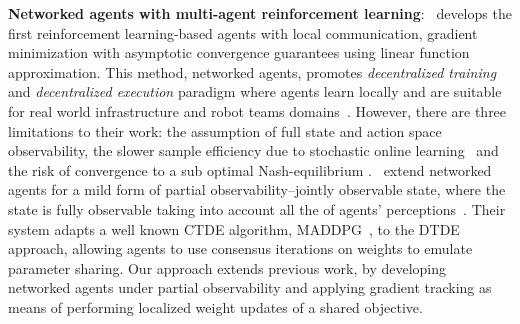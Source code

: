 \textbf{Networked agents with multi-agent reinforcement learning}:~\citet{zhang_2018}  develops the first reinforcement learning-based agents with local communication, gradient minimization with asymptotic convergence guarantees using linear function approximation. This method, networked agents, promotes {\em decentralized training} and {\em decentralized execution} paradigm where agents learn locally and are suitable for real world infrastructure and robot teams domains~\citep{gronauer_2022}. However, there are three limitations to their work: the assumption of full state and action space observability, the slower sample efficiency due to stochastic online learning~\citep{mnih_2016} and the risk of convergence to a sub optimal Nash-equilibrium \citep{zhang_2021}.~\citet{chen_2022} extend networked agents for a mild form of partial observability--jointly observable state, where the state is fully observable taking into account all the of agents' perceptions~\citep{oliehoek_2016}. Their system adapts a well known CTDE algorithm, MADDPG~\citep{lowe_2017}, to the DTDE approach, allowing agents to use consensus iterations on weights to emulate parameter sharing. Our approach extends previous work, by  developing networked agents under partial observability and applying gradient tracking  as means of performing localized weight updates of a shared objective.